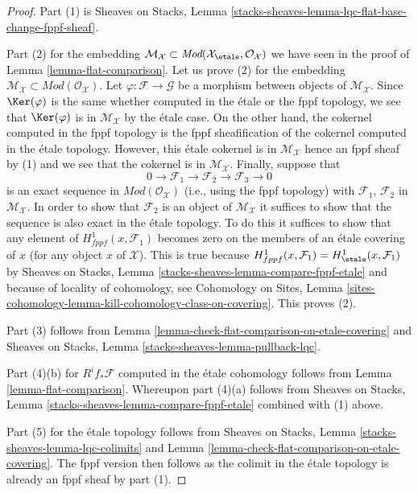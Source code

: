 \begin{proof}
Part (1) is
Sheaves on Stacks, Lemma
\ref{stacks-sheaves-lemma-lqc-flat-base-change-fppf-sheaf}.

\medskip\noindent
Part (2) for the embedding $\mathcal{M}_\mathcal{X} \subset
\textit{Mod}(\mathcal{X}_\etale, \mathcal{O}_\mathcal{X})$
we have seen in the proof of
Lemma \ref{lemma-flat-comparison}.
Let us prove (2) for the embedding
$\mathcal{M}_\mathcal{X} \subset \textit{Mod}(\mathcal{O}_\mathcal{X})$.
Let $\varphi : \mathcal{F} \to \mathcal{G}$ be a morphism between
objects of $\mathcal{M}_\mathcal{X}$. Since $\Ker(\varphi)$
is the same whether computed in the \'etale or the fppf
topology, we see that $\Ker(\varphi)$ is in
$\mathcal{M}_\mathcal{X}$ by the \'etale case. On the other hand,
the cokernel computed in the fppf topology is the fppf sheafification
of the cokernel computed in the \'etale topology. However, this
\'etale cokernel is in $\mathcal{M}_\mathcal{X}$ hence an fppf sheaf
by (1) and we see that the cokernel is in $\mathcal{M}_\mathcal{X}$.
Finally, suppose that
$$
0 \to \mathcal{F}_1 \to \mathcal{F}_2 \to \mathcal{F}_3 \to 0
$$
is an exact sequence in $\textit{Mod}(\mathcal{O}_\mathcal{X})$
(i.e., using the fppf topology) with $\mathcal{F}_1$, $\mathcal{F}_2$
in $\mathcal{M}_\mathcal{X}$. In order to show that $\mathcal{F}_2$
is an object of $\mathcal{M}_\mathcal{X}$ it suffices to show that
the sequence is also exact in the \'etale topology. To do this it
suffices to show that any element of $H^1_{fppf}(x, \mathcal{F}_1)$
becomes zero on the members of an \'etale covering of $x$ (for any
object $x$ of $\mathcal{X}$). This is true because
$H^1_{fppf}(x, \mathcal{F}_1) = H^1_\etale(x, \mathcal{F}_1)$ by
Sheaves on Stacks, Lemma \ref{stacks-sheaves-lemma-compare-fppf-etale}
and because of locality of cohomology, see
Cohomology on Sites, Lemma
\ref{sites-cohomology-lemma-kill-cohomology-class-on-covering}.
This proves (2).

\medskip\noindent
Part (3) follows from
Lemma \ref{lemma-check-flat-comparison-on-etale-covering}
and
Sheaves on Stacks, Lemma \ref{stacks-sheaves-lemma-pullback-lqc}.

\medskip\noindent
Part (4)(b) for $R^if_*\mathcal{F}$ computed in the \'etale cohomology
follows from Lemma \ref{lemma-flat-comparison}.
Whereupon part (4)(a) follows from
Sheaves on Stacks, Lemma \ref{stacks-sheaves-lemma-compare-fppf-etale}
combined with (1) above.

\medskip\noindent
Part (5) for the \'etale topology follows from
Sheaves on Stacks, Lemma \ref{stacks-sheaves-lemma-lqc-colimits} and
Lemma \ref{lemma-check-flat-comparison-on-etale-covering}.
The fppf version then follows as the colimit in the \'etale
topology is already an fppf sheaf by part (1).
\end{proof}

